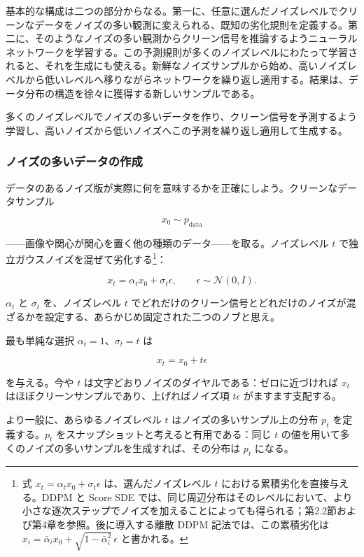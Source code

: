 基本的な構成は二つの部分からなる。第一に、任意に選んだノイズレベルでクリーンなデータをノイズの多い観測に変えられる、既知の劣化規則を定義する。第二に、そのようなノイズの多い観測からクリーン信号を推論するようニューラルネットワークを学習する。この予測規則が多くのノイズレベルにわたって学習されると、それを生成にも使える。新鮮なノイズサンプルから始め、高いノイズレベルから低いレベルへ移りながらネットワークを繰り返し適用する。結果は、データ分布の構造を徐々に獲得する新しいサンプルである。

\begin{propositionbox}[メッセージ]
多くのノイズレベルでノイズの多いデータを作り、クリーン信号を予測するよう学習し、高いノイズから低いノイズへこの予測を繰り返し適用して生成する。
\end{propositionbox}


\subsubsection*{ノイズの多いデータの作成}


データのあるノイズ版が実際に何を意味するかを正確にしよう。クリーンなデータサンプル

\[
x_0 \sim p_{\mathrm{data}}
\]


——画像や関心が関心を置く他の種類のデータ——を取る。ノイズレベル $t$ で独立ガウスノイズを混ぜて劣化する\footnote{式 $x_t = \alpha_t x_0 + \sigma_t \epsilon$ は、選んだノイズレベル $t$ における累積劣化を直接与える。DDPM と Score SDE では、同じ周辺分布はそのレベルにおいて、より小さな逐次ステップでノイズを加えることによっても得られる；第2.2節および第4章を参照。後に導入する離散 DDPM 記法では、この累積劣化は $x_i = \bar{\alpha}_i x_0 + \sqrt{1-\bar{\alpha}_i^2}\,\epsilon$ と書かれる。}：

\[
x_t = \alpha_t x_0 + \sigma_t \epsilon, \qquad \epsilon \sim \mathcal{N}(0, I).
\]


$\alpha_t$ と $\sigma_t$ を、ノイズレベル $t$ でどれだけのクリーン信号とどれだけのノイズが混ざるかを設定する、あらかじめ固定された二つのノブと思え。

最も単純な選択 $\alpha_t = 1$、$\sigma_t = t$ は

\[
x_t = x_0 + t\epsilon
\]


を与える。今や $t$ は文字どおりノイズのダイヤルである：ゼロに近づければ $x_t$ はほぼクリーンサンプルであり、上げればノイズ項 $t\epsilon$ がますます支配する。

より一般に、あらゆるノイズレベル $t$ はノイズの多いサンプル上の分布 $p_t$ を定義する。$p_t$ をスナップショットと考えると有用である：同じ $t$ の値を用いて多くのノイズの多いサンプルを生成すれば、その分布は $p_t$ になる。


